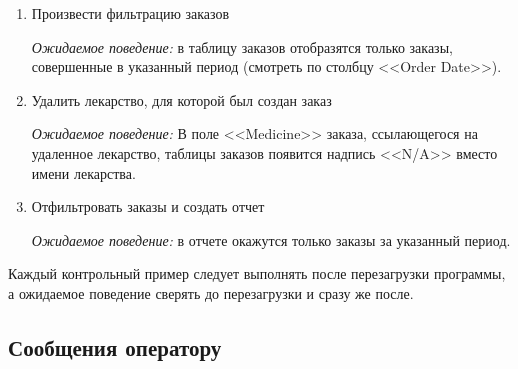 \begin{enumerate}
    \item Произвести фильтрацию заказов

        \textit{Ожидаемое поведение:} в таблицу заказов отобразятся только
        заказы, совершенные в указанный период (смотреть по столбцу <<Order
        Date>>).

    \item Удалить лекарство, для которой был создан заказ

        \textit{Ожидаемое поведение:} В поле <<Medicine>> заказа, ссылающегося
        на удаленное лекарство, таблицы заказов появится надпись <<N/A>> вместо
        имени лекарства.

    \item Отфильтровать заказы и создать отчет

        \textit{Ожидаемое поведение:} в отчете окажутся только заказы за
        указанный период.

\end{enumerate}

Каждый контрольный пример следует выполнять после перезагрузки программы, а
ожидаемое поведение сверять до перезагрузки и сразу же после.


\subsection{Сообщения оператору}

